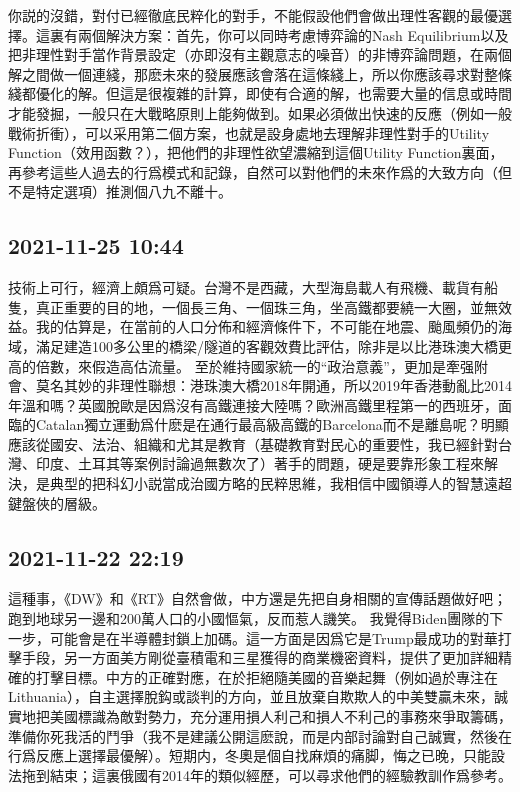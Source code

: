 \documentclass[twocolumn]{ctexart}
\begin{document}
你説的沒錯，對付已經徹底民粹化的對手，不能假設他們會做出理性客觀的最優選擇。這裏有兩個解決方案：首先，你可以同時考慮博弈論的Nash Equilibrium以及把非理性對手當作背景設定（亦即沒有主觀意志的噪音）的非博弈論問題，在兩個解之間做一個連綫，那麽未來的發展應該會落在這條綫上，所以你應該尋求對整條綫都優化的解。但這是很複雜的計算，即使有合適的解，也需要大量的信息或時間才能發掘，一般只在大戰略原則上能夠做到。如果必須做出快速的反應（例如一般戰術折衝），可以采用第二個方案，也就是設身處地去理解非理性對手的Utility Function（效用函數？），把他們的非理性欲望濃縮到這個Utility Function裏面，再參考這些人過去的行爲模式和記錄，自然可以對他們的未來作爲的大致方向（但不是特定選項）推測個八九不離十。
\subsection*{2021-11-25 10:44}

技術上可行，經濟上頗爲可疑。台灣不是西藏，大型海島載人有飛機、載貨有船隻，真正重要的目的地，一個長三角、一個珠三角，坐高鐵都要繞一大圈，並無效益。我的估算是，在當前的人口分佈和經濟條件下，不可能在地震、颱風頻仍的海域，滿足建造100多公里的橋梁/隧道的客觀效費比評估，除非是以比港珠澳大橋更高的倍數，來假造高估流量。
至於維持國家統一的“政治意義”，更加是牽强附會、莫名其妙的非理性聯想：港珠澳大橋2018年開通，所以2019年香港動亂比2014年溫和嗎？英國脫歐是因爲沒有高鐵連接大陸嗎？歐洲高鐵里程第一的西班牙，面臨的Catalan獨立運動爲什麽是在通行最高級高鐵的Barcelona而不是離島呢？明顯應該從國安、法治、組織和尤其是教育（基礎教育對民心的重要性，我已經針對台灣、印度、土耳其等案例討論過無數次了）著手的問題，硬是要靠形象工程來解決，是典型的把科幻小説當成治國方略的民粹思維，我相信中國領導人的智慧遠超鍵盤俠的層級。
\subsection*{2021-11-22 22:19}

這種事，《DW》和《RT》自然會做，中方還是先把自身相關的宣傳話題做好吧；跑到地球另一邊和200萬人口的小國慪氣，反而惹人譏笑。
我覺得Biden團隊的下一步，可能會是在半導體封鎖上加碼。這一方面是因爲它是Trump最成功的對華打擊手段，另一方面美方剛從臺積電和三星獲得的商業機密資料，提供了更加詳細精確的打擊目標。中方的正確對應，在於拒絕隨美國的音樂起舞（例如過於專注在Lithuania），自主選擇脫鈎或談判的方向，並且放棄自欺欺人的中美雙贏未來，誠實地把美國標識為敵對勢力，充分運用損人利己和損人不利己的事務來爭取籌碼，準備你死我活的鬥爭（我不是建議公開這麽說，而是内部討論對自己誠實，然後在行爲反應上選擇最優解）。短期内，冬奧是個自找麻煩的痛脚，悔之已晚，只能設法拖到結束；這裏俄國有2014年的類似經歷，可以尋求他們的經驗教訓作爲參考。
\end{document}
